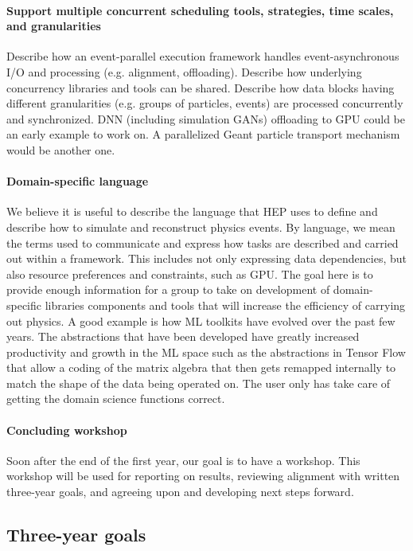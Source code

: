 \documentclass[12pt,a4paper]{article}
\begin{document}
\paragraph{Support multiple concurrent scheduling tools, strategies,
  time scales, and granularities} Describe how an event-parallel
execution framework handles event-asynchronous I/O and processing
(e.g. alignment, offloading). Describe how underlying concurrency
libraries and tools can be shared. Describe how data blocks having
different granularities (e.g.  groups of particles, events) are
processed concurrently and synchronized. DNN (including simulation
GANs) offloading to GPU could be an early example to work on. A
parallelized Geant particle transport mechanism would be another one.

\paragraph{Domain-specific language} We believe it is useful to
describe the language that HEP uses to define and describe how to
simulate and reconstruct physics events. By language, we mean the
terms used to communicate and express how tasks are described and
carried out within a framework. This includes not only expressing data
dependencies, but also resource preferences and constraints, such as
GPU. The goal here is to provide enough information for a group to
take on development of domain-specific libraries components and tools
that will increase the efficiency of carrying out physics. A good example
is how ML toolkits have evolved over the past few years. The 
abstractions that have been developed have greatly increased productivity 
and growth in the ML space such as the abstractions in Tensor Flow that 
allow a coding of the matrix algebra that then gets remapped internally to 
match the shape of the data being operated on.  The user only has take care
of getting the domain science functions correct.

\paragraph{Concluding workshop} Soon after the end of the first year,
our goal is to have a workshop. This workshop will be used for
reporting on results, reviewing alignment with written three-year
goals, and agreeing upon and developing next steps forward.

\subsection{Three-year goals}
\label{sec:three-year-goals}
\end{document}
